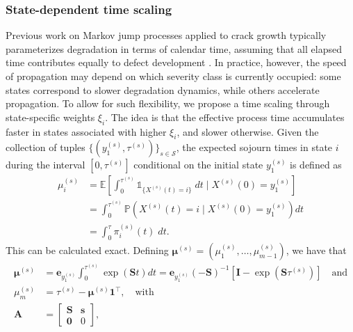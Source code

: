 \subsubsection{State-dependent time scaling} \label{sec:warping}
Previous work on Markov jump processes applied to crack growth typically parameterizes degradation in terms of calendar time, assuming that all elapsed time contributes equally to defect development \citep{bisgaard2024A}. 
In practice, however, the speed of propagation may depend on which severity class is currently occupied: some states correspond to slower degradation dynamics, while others accelerate propagation.
To allow for such flexibility, we propose a time scaling through state-specific weights $\xi_i$.
The idea is that the effective process time accumulates faster in states associated with higher $\xi_i$, and slower otherwise.
Given the collection of tuples $\{ ( y_1^{(s)}, \tau^{(s)} ) \}_{s \in \mathcal{S}}$, the expected sojourn times in state $i$ during the interval $\left[ 0,\tau^{(s)} \right]$ conditional on the initial state $y_1^{(s)}$ is defined as
\begin{equation*}
    \begin{aligned}
    \mu_i^{(s)} &=\mathbb{E} \left[ \int_0^{\tau^{(s)}} \mathds{1}_{\{X^{(s)}(t) = i\}} \; dt \mid X^{(s)}(0) = y_1^{(s)}  \right] \\ 
				&= \int_0^{\tau^{(s)}}\mathds{P}\left(X^{(s)}(t)=i \mid X^{(s)}(0)=y_1^{(s)}\right)dt \\ 
				&= \int_0^\tau \pi^{(s)}_i(t) \; dt.
\end{aligned}  \label{eq:cumulative_sojourn_time}
\end{equation*} 
This can be calculated exact. Defining $\bm{\mu}^{(s)}  =  \left(\mu_1^{(s)},\dots,\mu_{m-1}^{(s)}\right)$, we have that
\begin{equation*}
    \begin{aligned}
\bm{\mu}^{(s)} &= \bm{e}_{y_{1}^{(s)}} \int_0^{\tau^{(s)}}\exp\left(\bm{S}t\right) dt = \bm{e}_{y_{1}^{(s)}} (-\bm{S})^{-1}\left[\bm{I} - \exp \left( \bm{S}\tau^{(s)} \right) \right] \quad \text{and} \\ 
\mu_m^{(s)}  &= \tau^{(s)} - \bm{\mu}^{(s)}\bm{1}^\top, \quad \text{with} \\
\bm{A} &= \left[\begin{array}{cc} \bm{S} & \bm{s} \\
\bm{0} & 0\end{array}\right], 
    \end{aligned} 
\end{equation*}
